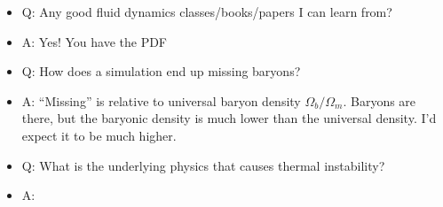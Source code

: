 \documentclass[12pt]{article}
\begin{document}
\begin{itemize}
\item{Q: Any good fluid dynamics classes/books/papers I can learn from?}
\item{A: Yes! You have the PDF}

\item{Q: How does a simulation end up missing baryons? }
\item{A: ``Missing'' is relative to universal baryon density $\Omega_b/\Omega_m$. Baryons are there, but the baryonic density is much lower than the universal density.
  I'd expect it to be much higher. }

\item{Q: What is the underlying physics that causes thermal instability?}
  \item{A:}
    
\end{itemize}
\end{document}
